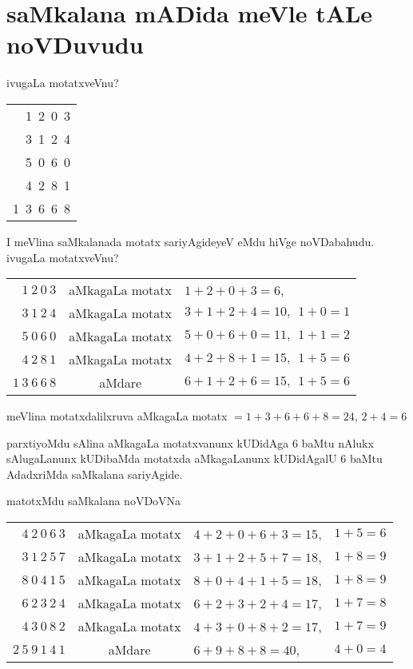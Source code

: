 \chapter{saMkalana mADida meVle tALe noVDuvudu}

ivugaLa motatxveVnu?

\begin{tabular}{r}
{\rm 1~2~0~3}\\
{\rm 3~1~2~4}\\
{\rm 5~0~6~0}\\
{\rm 4~2~8~1}\\\cline{1-1}
{\rm 1~3~6~6~8}
\end{tabular}

\smallskip

I meVlina saMkalanada motatx sariyAgideyeV eMdu hiVge noVDabahudu. ivugaLa motatxveVnu?

\smallskip

\begin{tabular}{rcl}
$1~ 2~ 0~  3$ & aMkagaLa motatx & $1+2+0+3=6$,\\
$3~1~2~4$ & aMkagaLa motatx & $3+1+2+4=10,~~ 1+0=1$\\
$5~0~6~0$ & aMkagaLa motatx & $5+0+6+0=11, ~~ 1+1=2$\\
$4~2~8~1$ & aMkagaLa motatx & $4+2+8+1=15, ~~ 1+5=6$\\\cline{1-1}
$1~3~6~6~8$ & aMdare & $6+1+2+6=15,~~ 1+5=6$ 
\end{tabular}

\smallskip

meVlina motatxdalilxruva aMkagaLa motatx $= 1+3+6+6+8=24$, $2+4=6$

parxtiyoMdu sAlina aMkagaLa motatxvanunx kUDidAga $6$ baMtu nAlukx sAlugaLanunx kUDibaMda motatxda aMkagaLanunx kUDidAgalU $6$ baMtu AdadxriMda saMkalana sariyAgide.

\newpage

matotxMdu saMkalana noVDoVNa

\smallskip

\begin{tabular}{rcll}
$4~2~0~6~3$ & aMkagaLa motatx & $4+2+0+6+3=15$, & $1+5=6$\\ 
$3~1~2~5~7$ & aMkagaLa motatx & $3+1+2+5+7=18$, & $1+8=9$\\
$8~0~4~1~5$ & aMkagaLa motatx & $8+0+4+1+5=18$, & $1+8=9$\\
$6~2~3~2~4$ & aMkagaLa motatx & $6+2+3+2+4=17$, & $1+7=8$\\
$4~3~0~8~2$ & aMkagaLa motatx & $4+3+0+8+2=17$, & $1+7=9$\\\cline{1-1}\cline{4-4}
$2~5~9~1~4~1$ & aMdare & \qquad $6+9+8+8=40$, & $4+0=4$
\end{tabular}

